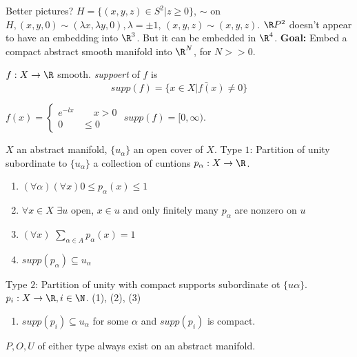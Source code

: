   Better pictures?
  \newline $H=\{(x,y,z) \in S^2 | z\geq 0\}$, $\sim$ on $H, (x,y,0)\sim (\lambda x, \lambda y, 0), \lambda = \pm 1$, $(x,y,z)\sim (x,y,z)$.
  \newline $\R P^2$ doesn't appear to have an embedding into $\R^3$. But it can be embedded in $\R^4$.
  \newline \textbf{Goal:} Embed a compact abstract smooth manifold into $\R^N$, for $N>>0$.
  \begin{definition}
    $f: X\to \R$ smooth. \emph{suppoert} of $f$ is
      $$supp(f)= \bar{\{x\in X | f(x) \neq 0 \}}$$
  \end{definition}
\begin{example}
  $f(x)=
    \begin{cases}
      e^{- l x } \qquad x>0 \\
      0 \qquad \leq 0
    \end{cases}
  $
  $supp(f)=[0,\infty)$.
\end{example}
\begin{definition}
  $X$ an abstract manifold, $\{u_{\alpha}\}$ an open cover of $X$. Type $1$: Partition of unity subordinate to $\{u_\alpha \}$ a collection of cuntions $p_{\alpha}: X\to \R$.
    \begin{enumerate}[(1)]
      \item $(\forall \alpha)(\forall x) 0 \leq p_\alpha (x)\leq 1$
      \item $\forall x\in X$ $\exists u$ open, $x\in u$ and only finitely many $p_\alpha$ are nonzero on $u$
      \item $(\forall x)$ $\sum_{\alpha \in A}p_{\alpha}(x)=1$
      \item $supp(p_\alpha)\subseteq u_\alpha$
    \end{enumerate}
  Type $2$: Partition of unity with compact supports subordinate ot $\{u\alpha\}$.
  \newline $p_i: X\to \R, i \in \N$.
    \newline (1), (2), (3)
  \begin{enumerate}[(4)]
    \item $supp(p_i)\subseteq u_\alpha$ for some $\alpha$ and $supp(p_i)$ is compact.
  \end{enumerate}
\end{definition}

\begin{remark}
  $P, O, U$ of either type always exist on an abstract manifold.
\end{remark}

